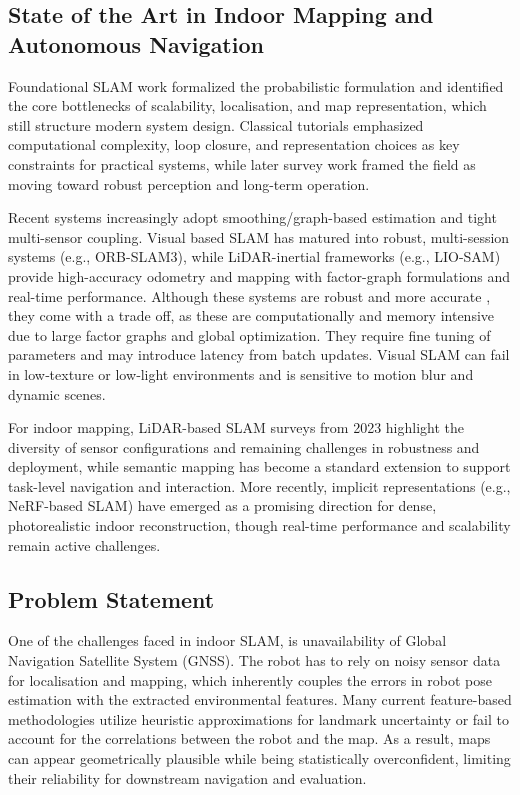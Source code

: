 \documentclass[11pt]{article}
\begin{document}
	\subsection{State of the Art in Indoor Mapping and Autonomous Navigation}
	\label{sec:sota_indoor}
	
	Foundational SLAM work formalized the probabilistic formulation and identified the core bottlenecks of scalability, localisation, and map representation, which still structure modern system design. Classical tutorials emphasized computational complexity, loop closure, and representation choices as key constraints for practical systems, while later survey work framed the field as moving toward robust perception and long-term operation. \cite{durrant2006slam,cadena2016past}
	
	Recent systems increasingly adopt smoothing/graph-based estimation and tight multi-sensor coupling. Visual based SLAM has matured into robust, multi-session systems (e.g., ORB-SLAM3), while LiDAR-inertial frameworks (e.g., LIO-SAM) provide high-accuracy odometry and mapping with factor-graph formulations and real-time performance. Although these systems are robust and more accurate , they come with a trade off, as these are computationally and memory intensive due to large factor graphs and global optimization. They require fine tuning of parameters and may introduce latency from batch updates. Visual SLAM can fail in low‑texture or low‑light environments and is sensitive to motion blur and dynamic scenes.
		
	For indoor mapping, LiDAR-based SLAM surveys from 2023 highlight the diversity of sensor configurations and remaining challenges in robustness and deployment, while semantic mapping has become a standard extension to support task-level navigation and interaction. \cite{yue2023lidar_slam_survey} More recently, implicit representations (e.g., NeRF-based SLAM) have emerged as a promising direction for dense, photorealistic indoor reconstruction, though real-time performance and scalability remain active challenges. \cite{yang2024nerf_slam_survey}
	
\subsection{Problem Statement}

One of the challenges faced in indoor SLAM, is unavailability of Global Navigation Satellite System (GNSS). The robot has to rely on noisy sensor data for localisation and mapping, which inherently couples the errors in robot pose estimation with the extracted environmental features. Many current feature-based methodologies utilize heuristic approximations for landmark uncertainty or fail to account for the correlations between the robot and the map. As a result, maps can appear geometrically plausible while being statistically overconfident, limiting their reliability for downstream navigation and evaluation.
\end{document}
